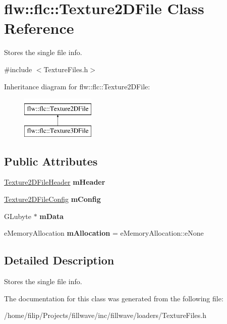 \hypertarget{classflw_1_1flc_1_1Texture2DFile}{}\section{flw\+:\+:flc\+:\+:Texture2\+D\+File Class Reference}
\label{classflw_1_1flc_1_1Texture2DFile}


Stores the single file info.  




{\ttfamily \#include $<$Texture\+Files.\+h$>$}

Inheritance diagram for flw\+:\+:flc\+:\+:Texture2\+D\+File\+:\begin{figure}[H]
\begin{center}
\leavevmode
\includegraphics[height=2.000000cm]{classflw_1_1flc_1_1Texture2DFile}
\end{center}
\end{figure}
\subsection*{Public Attributes}
\begin{DoxyCompactItemize}
\item 
\hyperlink{classflw_1_1flc_1_1Texture2DFileHeader}{Texture2\+D\+File\+Header} {\bfseries m\+Header}\hypertarget{classflw_1_1flc_1_1Texture2DFile_aa933c4db77e23660d6e14fa362bea754}{}\label{classflw_1_1flc_1_1Texture2DFile_aa933c4db77e23660d6e14fa362bea754}

\item 
\hyperlink{classflw_1_1flc_1_1Texture2DFileConfig}{Texture2\+D\+File\+Config} {\bfseries m\+Config}\hypertarget{classflw_1_1flc_1_1Texture2DFile_ad189b5ef185d24871c9e3ed4bcf1ee24}{}\label{classflw_1_1flc_1_1Texture2DFile_ad189b5ef185d24871c9e3ed4bcf1ee24}

\item 
G\+Lubyte $\ast$ {\bfseries m\+Data}\hypertarget{classflw_1_1flc_1_1Texture2DFile_ae8bc963242887da04a2c3daf36def096}{}\label{classflw_1_1flc_1_1Texture2DFile_ae8bc963242887da04a2c3daf36def096}

\item 
e\+Memory\+Allocation {\bfseries m\+Allocation} = e\+Memory\+Allocation\+::e\+None\hypertarget{classflw_1_1flc_1_1Texture2DFile_a10bd5ad60a51b29aa50d673557d3fbcf}{}\label{classflw_1_1flc_1_1Texture2DFile_a10bd5ad60a51b29aa50d673557d3fbcf}

\end{DoxyCompactItemize}


\subsection{Detailed Description}
Stores the single file info. 

The documentation for this class was generated from the following file\+:\begin{DoxyCompactItemize}
\item 
/home/filip/\+Projects/fillwave/inc/fillwave/loaders/Texture\+Files.\+h\end{DoxyCompactItemize}
